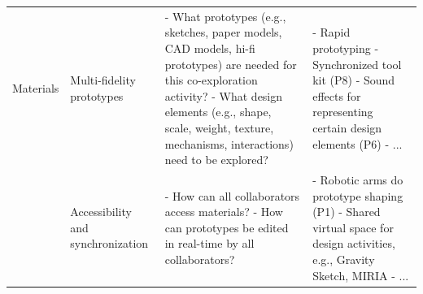 \documentclass[11pt]{article}
\begin{document}
\begin{table}[ht]
\begin{tabular}{|l|p{3.2cm}|p{4.5cm}|p{4.5cm}|}
Materials & Multi-fidelity prototypes 
& - What prototypes (e.g., sketches, paper models, CAD models, hi-fi prototypes) are needed for this co-exploration activity? \newline - What design elements (e.g., shape, scale, weight, texture, mechanisms, interactions) need to be explored?\newline {~}
& - Rapid prototyping \newline - Synchronized tool kit (P8) \newline - Sound effects for representing certain design elements (P6) \newline - ... \newline {~}\\


{~} & Accessibility and synchronization 
& - How can all collaborators access materials? \newline - How can prototypes be edited in real-time by all collaborators? \newline {~}
& - Robotic arms do prototype shaping (P1) \newline - Shared virtual space for design activities, e.g., Gravity Sketch\cite{Gravitysketch}, MIRIA\cite{buschel2021miria} \newline - ... \newline {~}\\
\hline

\end{tabular}
\end{table}
\end{document}
